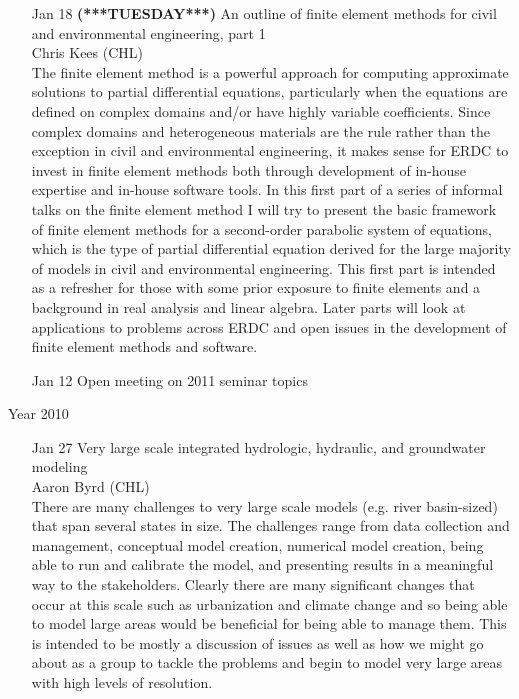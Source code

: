 \documentclass[12]{article}
\begin{document}
\begin{enumerate}
\item[Jan 18 {\bf (***TUESDAY***)}] An outline of finite element methods for civil and
  environmental engineering, part 1\\ Chris Kees (CHL) \\ 
The finite element method is a powerful approach for computing
approximate solutions to partial differential equations, particularly
when the equations are defined on complex domains and/or have highly
variable coefficients. Since complex domains and heterogeneous
materials are the rule rather than the exception in civil and
environmental engineering, it makes sense for ERDC to invest in finite
element methods both through development of in-house expertise and in-house
software tools. In this first part of a series of informal talks on
the finite element method I will try to present the basic framework of
finite element methods for a second-order parabolic system of equations, which is
the type of partial differential equation derived for the large
majority of models in civil and environmental engineering. This first
part is intended as a refresher for those with some prior exposure
to finite elements and a background in real analysis and linear
algebra. Later parts will look at applications to problems across ERDC
and open issues in the development of finite element methods and
software.

\item[Jan 12] Open meeting on 2011 seminar topics

\end{enumerate}

\begin{center}
\Large
Year 2010
\end{center}

\begin{enumerate}

\item[Jan 27] Very large scale integrated hydrologic, hydraulic, and
groundwater modeling\\ Aaron Byrd (CHL) \\
There are many challenges to very large scale models (e.g.
river basin-sized) that span several states in size. The challenges
range from data collection and management, conceptual model creation,
numerical model creation, being able to run and calibrate the model, and
presenting results in a meaningful way to the stakeholders. Clearly
there are many significant changes that occur at this scale such as
urbanization and climate change and so being able to model large areas
would be beneficial for being able to manage them. This is intended to
be mostly a discussion of issues as well as how we might go about as a
group to tackle the problems and begin to model very large areas with
high levels of resolution. 

\end{enumerate}
\end{document}
